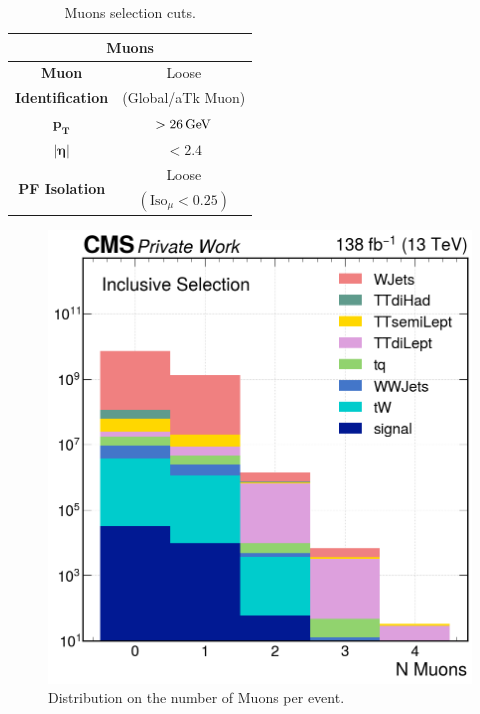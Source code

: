 \begin{minipage}{\linewidth}
\begin{minipage}{0.46\linewidth}
\vspace{-1.25cm}
        \begin{table}[H]
        \centering
        \begin{tabular}{c|c}
            \toprule
            \multicolumn{2}{c}{\textbf{Muons}}\\
            \midrule
            \midrule
            \textbf{Muon} & Loose\\
            \textbf{Identification}& (Global/aTk Muon)\\
            \midrule
            $\mathbf{p_T}$& $>26 {\,\text{Ge\hspace{-.08em}V}}$\\
            \midrule
            $\bm{|\eta|}$& $<2.4$ \\
            \midrule
            \multirow{2}{*}{\textbf{PF Isolation}}&Loose\\
            &$(\text{Iso}_\mu<0.25)$\\
            \bottomrule
        \end{tabular}
        \caption{Muons selection cuts.}
    \end{table}
\end{minipage}
\hfill
\begin{minipage}{0.53\linewidth}
      \begin{figure}[H]
            \centering
            \includegraphics[width=1\linewidth]{fig//chap07-selection/nMuons.png}
            \caption{Distribution on the number of Muons per event.}
            \label{fig:n_mu}
        \end{figure}
\end{minipage}
\end{minipage}


